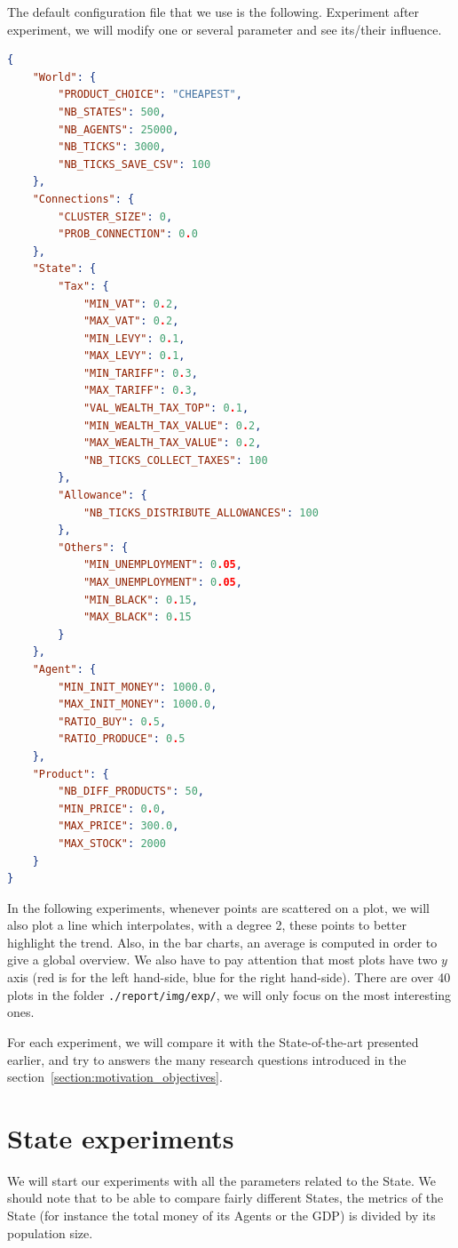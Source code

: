 The default configuration file that we use is the following. Experiment after experiment, we will modify one or several parameter and see its/their influence. 

\begin{lstlisting}[language=json,firstnumber=1]
{
    "World": {
        "PRODUCT_CHOICE": "CHEAPEST",
        "NB_STATES": 500,
        "NB_AGENTS": 25000,
        "NB_TICKS": 3000,
        "NB_TICKS_SAVE_CSV": 100
    },
    "Connections": {
        "CLUSTER_SIZE": 0,
        "PROB_CONNECTION": 0.0
    },
    "State": {
        "Tax": {
            "MIN_VAT": 0.2,
            "MAX_VAT": 0.2,
            "MIN_LEVY": 0.1,
            "MAX_LEVY": 0.1,
            "MIN_TARIFF": 0.3,
            "MAX_TARIFF": 0.3,
            "VAL_WEALTH_TAX_TOP": 0.1,
            "MIN_WEALTH_TAX_VALUE": 0.2,
            "MAX_WEALTH_TAX_VALUE": 0.2,
            "NB_TICKS_COLLECT_TAXES": 100
        },
        "Allowance": {
            "NB_TICKS_DISTRIBUTE_ALLOWANCES": 100
        },
        "Others": {
            "MIN_UNEMPLOYMENT": 0.05,
            "MAX_UNEMPLOYMENT": 0.05,
            "MIN_BLACK": 0.15,
            "MAX_BLACK": 0.15
        }
    },
    "Agent": {
        "MIN_INIT_MONEY": 1000.0,
        "MAX_INIT_MONEY": 1000.0,
        "RATIO_BUY": 0.5,
        "RATIO_PRODUCE": 0.5
    },
    "Product": {
        "NB_DIFF_PRODUCTS": 50,
        "MIN_PRICE": 0.0,
        "MAX_PRICE": 300.0,
        "MAX_STOCK": 2000
    }
}
\end{lstlisting}

In the following experiments, whenever points are scattered on a plot, we will also plot a line which interpolates, with a degree 2, these points to better highlight the trend. Also, in the bar charts, an average is computed in order to give a global overview. We also have to pay attention that most plots have two $y$ axis (red is for the left hand-side, blue for the right hand-side). There are over 40 plots in the folder \texttt{./report/img/exp/}, we will only focus on the most interesting ones.

For each experiment, we will compare it with the State-of-the-art presented earlier, and try to answers the many research questions introduced in the section~\ref{section:motivation_objectives}.


\section{State experiments}

We will start our experiments with all the parameters related to the State. We should note that to be able to compare fairly different States, the metrics of the State (for instance the total money of its Agents or the GDP) is divided by its population size. 

